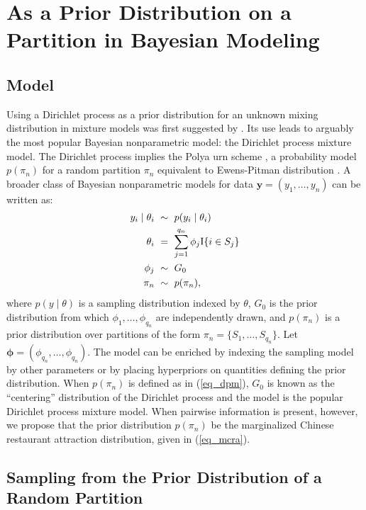 \documentclass[lineno]{biometrika-dbd}
\newcommand{\partition}{\ensuremath{\pi}}
\newcommand{\given}{\mid}
\newcommand{\I}[1]{\ensuremath{\text{\textnormal{I}}\{#1\}}}
\begin{document}
\section{As a Prior Distribution on a Partition in Bayesian Modeling}
\label{sec_modeling}

\subsection{Model}

Using a Dirichlet process \citep{ferg:1973} as a prior distribution for an
unknown mixing distribution in mixture models was first suggested by
\citet{anto:1974}.  Its use leads to arguably the most popular Bayesian
nonparametric model: the Dirichlet process mixture model.  The Dirichlet
process implies the Polya urn scheme \citep{blac:macq:1973}, a probability
model $p(\partition_n)$ for a random partition $\partition_n$ equivalent to Ewens-Pitman
distribution \citep{ewens:1972,pitm:1995,pitm:1996}.
A broader class of Bayesian nonparametric models for data $\bm{y} =
(y_1,\ldots,y_n)$ can be written as:
\begin{equation}
\label{eq_bnp_dpm}
\begin{split}
y_i \given \theta_i \ & \sim \ p(y_i \given \theta_i) \\
\theta_i \ & = \ \sum_{j=1}^{q_n} \phi_j \I{i \in S_j} \\
\phi_j \ & \sim \ G_0 \\
\partition_n \ & \sim \ p(\partition_n),
\end{split}
\end{equation}
where $p(y \given \theta)$ is a sampling distribution indexed by $\theta$,
$G_0$ is the prior distribution from which $\phi_1,\ldots,\phi_{q_n}$ are
independently drawn, and $p(\partition_n)$ is a prior distribution over
partitions of the form $\partition_n = \{S_1,\ldots,S_{q_n}\}$.  Let $\bm{\phi}
= (\phi_{q_n},\ldots,\phi_{q_n})$.  The model can be enriched by indexing the
sampling model by other parameters or by placing hyperpriors on quantities
defining the prior distribution.  When $p(\partition_n)$ is defined as in
(\ref{eq_dpm}), $G_0$ is known as the ``centering'' distribution of the
Dirichlet process and the model is the popular Dirichlet process mixture model.
When pairwise information is present, however, we propose that the prior
distribution $p(\partition_n)$ be the marginalized Chinese restaurant
attraction distribution, given in (\ref{eq_mcra}).

\subsection{Sampling from the Prior Distribution of a Random Partition}
\end{document}
